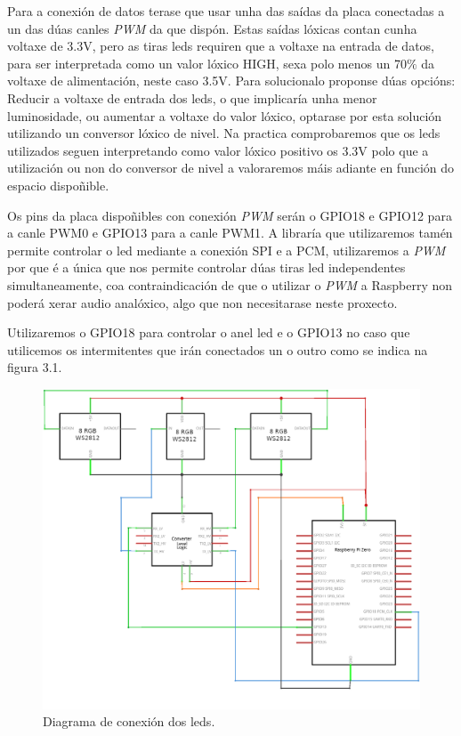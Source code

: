 Para a conexión de datos terase que usar unha das saídas da placa conectadas a un das dúas canles \emph{PWM} da que dispón. Estas saídas lóxicas contan cunha voltaxe de 3.3V, pero as tiras leds requiren que a voltaxe na entrada de datos, para ser interpretada como un valor lóxico HIGH, sexa polo menos un 70\(\%\) da  voltaxe de alimentación, neste caso 3.5V. Para solucionalo proponse dúas opcións: Reducir a voltaxe de entrada dos leds, o que implicaría unha menor luminosidade, ou aumentar a voltaxe do valor lóxico, optarase por esta solución utilizando un conversor lóxico de nivel. Na practica comprobaremos que os leds utilizados seguen interpretando como valor lóxico positivo os 3.3V polo que a utilización ou non do conversor de nivel a valoraremos máis adiante en función do espacio dispoñible.

Os pins da placa dispoñibles con conexión \emph{PWM} serán o GPIO18 e GPIO12 para a canle PWM0 e GPIO13 para a canle PWM1. A libraría que utilizaremos tamén permite controlar o led mediante a conexión SPI e a PCM, utilizaremos a \emph{PWM} por que é a única que nos permite controlar dúas tiras led independentes simultaneamente, coa contraindicación de que o utilizar o \emph{PWM} a Raspberry non poderá xerar audio analóxico, algo que non necesitarase neste proxecto.

Utilizaremos o GPIO18 para controlar o anel led e o GPIO13 no caso que utilicemos os intermitentes que irán conectados un o outro como se indica na figura 3.1.

\begin{figure}[tb]
  \centering
  \includegraphics[scale=1]{imaxes/circuito-leds.png}
  \caption{Diagrama de conexión dos leds.}
  \label{f:conexións cos leds}
\end{figure}

